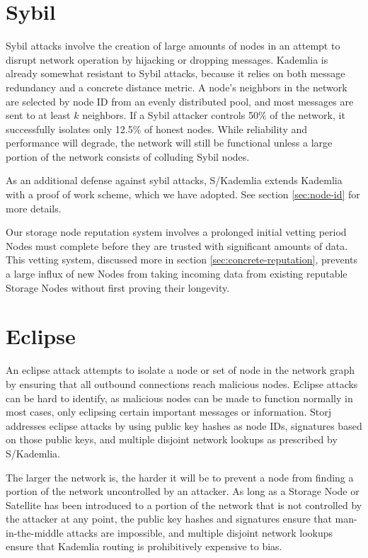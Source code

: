\documentclass[8pt,fleqn,openany]{book}
\begin{document}
\section{Sybil}

Sybil attacks involve the creation of large amounts of nodes in an attempt to
disrupt network operation by hijacking or dropping messages. Kademlia
\cite{kad} is already somewhat resistant to Sybil attacks, because
it relies on both message redundancy and a concrete distance metric.
A node's neighbors in the network are selected by
node ID from an evenly distributed pool, and most messages are sent to at least
$k$ neighbors. If a Sybil attacker controls 50\% of the network, it
successfully isolates only 12.5\% of honest nodes. While reliability and
performance will degrade, the network will still be functional unless a large
portion of the network consists of colluding Sybil nodes.

As an additional defense against sybil attacks, S/Kademlia \cite{skad}
extends Kademlia with a proof of work scheme, which we have adopted. See section
\ref{sec:node-id} for more details.

Our storage node reputation system involves a prolonged initial vetting
period Nodes must complete before they are trusted with significant amounts
of data. This vetting system, discussed more in section
\ref{sec:concrete-reputation}, prevents a large influx of new Nodes from taking
incoming data from existing reputable Storage Nodes without first proving
their longevity.

\section{Eclipse}

An eclipse attack attempts to isolate a node or set of node in the network
graph by ensuring that all outbound connections reach malicious nodes. Eclipse
attacks can be hard to identify, as malicious nodes can be made to function
normally in most cases, only eclipsing certain important messages or
information. Storj addresses eclipse attacks by using public key hashes as node
IDs, signatures based on those public keys, and multiple disjoint network
lookups as prescribed by S/Kademlia.

The larger the network is, the harder it will
be to prevent a node from finding a portion of the network uncontrolled by
an attacker.
As long as a Storage Node or Satellite has been introduced to a portion of
the network that is not controlled by the attacker at any point, the public
key hashes and signatures ensure that man-in-the-middle attacks are impossible,
and multiple disjoint network lookups ensure that Kademlia routing is
prohibitively expensive to bias.
\end{document}
